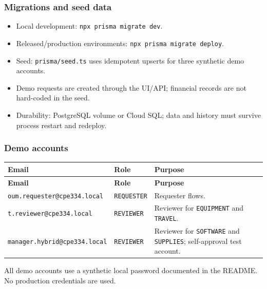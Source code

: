 \documentclass[11pt,a4paper]{article}
\begin{document}
\subsubsection{Migrations and seed data}

\begin{itemize}[leftmargin=*,itemsep=2pt,topsep=2pt]
  \item Local development: \texttt{npx prisma migrate dev}.
  \item Released/production environments: \texttt{npx prisma migrate deploy}.
  \item Seed: \texttt{prisma/seed.ts} uses idempotent upserts for three synthetic demo accounts.
  \item Demo requests are created through the UI/API; financial records are not hard-coded in the seed.
  \item Durability: PostgreSQL volume or Cloud SQL; data and history must survive process restart and redeploy.
\end{itemize}
\subsubsection{Demo accounts}

\vspace{0.3em}
\begin{longtable}{|>{\RaggedRight}p{5.5cm}|>{\centering\arraybackslash}p{2.5cm}|>{\RaggedRight}p{7.8cm}|}
\hline
\rowcolor{zenPale}\textbf{Email} & \textbf{Role} & \textbf{Purpose} \\ \hline
\endfirsthead
\hline
\rowcolor{zenPale}\textbf{Email} & \textbf{Role} & \textbf{Purpose} \\ \hline
\endhead
\hline
\endfoot
\texttt{oum.\allowbreak requester@cpe334.\allowbreak local} & \texttt{REQUESTER} & Requester flows. \\ \hline
\texttt{t.\allowbreak reviewer@cpe334.\allowbreak local} & \texttt{REVIEWER} & Reviewer for \texttt{EQUIPMENT} and \texttt{TRAVEL}. \\ \hline
\texttt{manager.\allowbreak hybrid@cpe334.\allowbreak local} & \texttt{REVIEWER} & Reviewer for \texttt{SOFTWARE} and \texttt{SUPPLIES}; self-approval test account. \\ \hline
\end{longtable}
\vspace{0.3em}

All demo accounts use a synthetic local password documented in the README. No production credentials are used.\\
\end{document}

